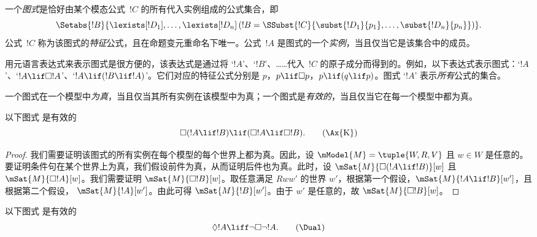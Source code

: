 \documentclass[../../../include/open-logic-section]{subfiles}
\begin{document}


\begin{defn}
  一个\emph{图式}是恰好由某个模态公式~$!C$ 的所有代入实例组成的公式集合，即
  \[
  \Setabs{!B}{\lexists[!D_1], \dots, \lexists[!D_n] \left(!B =
  \SSubst{!C}{\subst{!D_1}{p_1}, \dots, \subst{!D_n}{p_n}} \right) }.
  \]
  公式~$!C$ 称为该图式的\emph{特征}公式，且在命题变元重命名下唯一。公式~$!A$ 是图式的一个\emph{实例}，当且仅当它是该集合中的成员。
\end{defn}

用元语言表达式来表示图式是很方便的，该表达式是通过将 `$!A$'、`$!B$'、……代入~$!C$ 的原子成分而得到的。例如，以下表达式表示图式：`$!A$'、`$!A \lif \Box!A$'、`$!A \lif (!B \lif !A)$'。它们对应的特征公式分别是 $p$，$p \lif \Box p$，$p \lif (q
\lif p)$。图式 `$!A$' 表示\emph{所有}公式的集合。

\begin{defn}
  一个图式在一个模型中\emph{为真}，当且仅当其所有实例在该模型中为真；一个图式是\emph{有效的}，当且仅当它在每一个模型中都为真。
\end{defn}

\begin{prop}
  以下图式  是有效的
  \begin{equation*}
  \Box(!A \lif !B) \lif (\Box !A \lif \Box !B). \tag{\Ax{K}}
  \end{equation*}
\end{prop}

\begin{proof}
  我们需要证明该图式的所有实例在每个模型的每个世界上都为真。因此，设 $\mModel{M} = \tuple{W,R,V}$ 且 $w \in
  W$ 是任意的。要证明条件句在某个世界上为真，我们假设前件为真，从而证明后件也为真。此时，设 $\mSat{M}{\Box(!A \lif !B)}[w]$ 且
  $\mSat{M}{\Box !A}[w]$。我们需要证明 $\mSat{M}{\Box !B}[w]$。取任意满足 $Rww'$ 的世界 $w'$，根据第一个假设，$\mSat{M}{!A \lif !B}[w']$，且根据第二个假设，
  $\mSat{M}{!A}[w']$。由此可得 $\mSat{M}{!B}[w']$。由于 $w'$ 是任意的，故 $\mSat{M}{\Box !B}[w]$。
\end{proof}

\begin{prop}
  以下图式 \Dual{} 是有效的
  \begin{equation*}
  \Diamond !A \liff \lnot\Box\lnot !A. \tag{\Dual}
  \end{equation*}
\end{prop}
\end{document}
